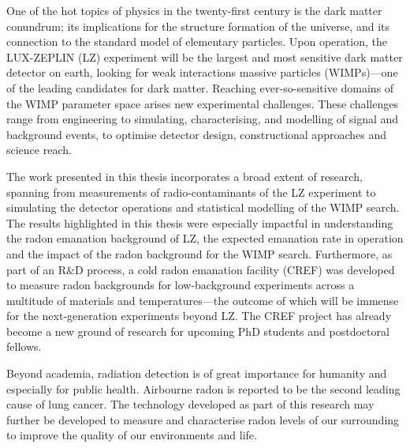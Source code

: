 \begin{impactstatement}

One of the hot topics of physics in the twenty-first century is the dark matter conundrum; its implications for the structure formation of the universe, and its connection to the standard model of elementary particles. Upon operation, the LUX-ZEPLIN (LZ) experiment will be the largest and most sensitive dark matter detector on earth, looking for weak interactions massive particles (WIMPs)—one of the leading candidates for dark matter. Reaching ever-so-sensitive domains of the WIMP parameter space arises new experimental challenges. These challenges range from engineering to simulating, characterising, and modelling of signal and background events, to optimise detector design, constructional approaches and science reach.  

The work presented in this thesis incorporates a broad extent of research, spanning from measurements of radio-contaminants of the LZ experiment to simulating the detector operations and statistical modelling of the WIMP search. The results highlighted in this thesis were especially impactful in understanding the radon emanation background of LZ, the expected emanation rate in operation and the impact of the radon background for the WIMP search. Furthermore, as part of an R&D process, a cold radon emanation facility (CREF) was developed to measure radon backgrounds for low-background experiments across a multitude of materials and temperatures—the outcome of which will be immense for the next-generation experiments beyond LZ. The CREF project has already become a new ground of research for upcoming PhD students and postdoctoral fellows. 

Beyond academia, radiation detection is of great importance for humanity and especially for public health. Airbourne radon is reported to be the second leading cause of lung cancer. The technology developed as part of this research may further be developed to measure and characterise radon levels of our surrounding to improve the quality of our environments and life.

\end{impactstatement}


